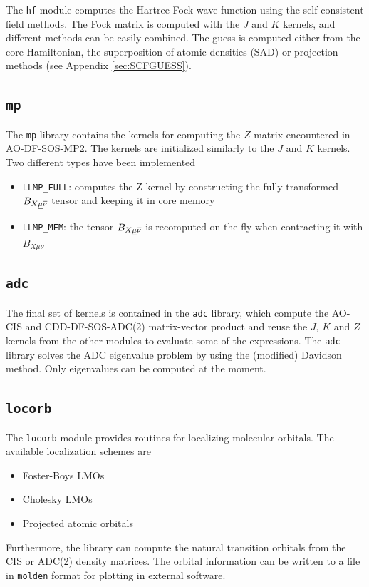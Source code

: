 The \texttt{hf} module computes the Hartree-Fock wave function using the self-consistent field methods. The Fock matrix is computed with the $J$ and $K$ kernels, and different methods can be easily combined. The guess is computed either from the core Hamiltonian, the superposition of atomic densities (SAD) or projection methods (see Appendix \ref{sec:SCFGUESS}). 

\subsection{\texttt{mp}}

The \texttt{mp} library contains the kernels for computing the $Z$ matrix encountered in AO-DF-SOS-MP2. The kernels are initialized similarly to the $J$ and $K$ kernels. Two different types have been implemented 
\begin{itemize}
\item \texttt{LLMP\_FULL}: computes the Z kernel by constructing the fully transformed $B_{X\underline{\mu}\overline{\nu}}$ tensor and keeping it in core memory
\item \texttt{LLMP\_MEM}: the tensor $B_{X\underline{\mu}\overline{\nu}}$ is recomputed on-the-fly when contracting it with $B_{X\mu\nu}$
\end{itemize} 

\subsection{\texttt{adc}}

The final set of kernels is contained in the \texttt{adc} library, which compute the AO-CIS and CDD-DF-SOS-ADC(2) matrix-vector product and reuse the $J$, $K$ and $Z$ kernels from the other modules to evaluate some of the expressions. The \texttt{adc} library solves the ADC eigenvalue problem by using the (modified) Davidson method. Only eigenvalues can be computed at the moment.

\subsection{\texttt{locorb}}

The \texttt{locorb} module provides routines for localizing molecular orbitals. The available localization schemes are
\begin{itemize}
\item Foster-Boys LMOs 
\item Cholesky LMOs
\item Projected atomic orbitals
\end{itemize}
\noindent Furthermore, the library can compute the natural transition orbitals from the CIS or ADC(2) density matrices. The orbital information can be written to a file in \texttt{molden} format for plotting in external software. 

